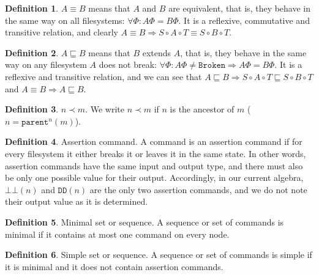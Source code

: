 \documentclass[12pt]{article}
\newcommand{\empt}{\bot}
\newcommand{\parent}{\mathtt{parent}}
\newcommand{\fsbroken}{\mathtt{Broken}} %
\newcommand{\FS}{\Phi} %
\newcommand{\fscommand}[2]{{#1#2}}
\newcommand{\fsregcommandchar}[1]{\mathtt{#1}}
\newcommand{\fsregcommand}[2]{\fscommand{\fsregcommandchar{#1}}{\fsregcommandchar{#2}}}
\newcommand{\cbb}{\fsregcommand{\empt}{\empt}}
\newcommand{\cdd}{\fsregcommand{D}{D}}
\newcommand{\cc}{\circ} %
\newcommand{\descendant}{\prec}
\newcommand{\eqext}{\sqsubseteq}
\theoremstyle{definition}
\newtheorem{mydef}{Definition}
\begin{document}
\begin{mydef}
$A\equiv B$ means that $A$ and $B$ are equivalent,
that is, they behave in the same way on
all filesystems: $\forall \FS: A\FS=B\FS$.
It is a reflexive, commutative and transitive relation,
and clearly
$ A\equiv B \Rightarrow S\cc A\cc T\equiv S\cc B\cc T $.
\end{mydef}

\begin{mydef}
$A\eqext B$ means that $B$ extends $A$,
that is, they behave in the same way
on any filesystem $A$ does not break:
$\forall \FS: A\FS\neq\fsbroken\Rightarrow A\FS=B\FS$.
It is a reflexive and transitive relation,
and we can see that
$ A\eqext B \Rightarrow S\cc A\cc T\eqext S\cc B\cc T$
and
$ A\equiv B \Rightarrow A\eqext B$.
\end{mydef}








\begin{mydef}{$n\descendant m$.}
We write $n\descendant m$ if $n$ is the ancestor of $m$ ($n=\parent^n(m)$). %
\end{mydef}

\begin{mydef}{Assertion command.}
A command is an assertion command if
for every filesystem it either breaks it or leaves it in the same state.
In other words, assertion commands have the same input and output type,
and there must also be only one possible value for their output.
Accordingly, in our current algebra, $\cbb(n)$ and $\cdd(n)$ are the only two assertion commands,
and we do not note their output value as it is determined.
\end{mydef}

\begin{mydef}{Minimal set or sequence.}
A sequence or set of commands is minimal if it contains at most one command on every node.
\end{mydef}

\begin{mydef}{Simple set or sequence.}
A sequence or set of commands is simple if it is minimal and it does not contain assertion commands.
\end{mydef}
\end{document}
